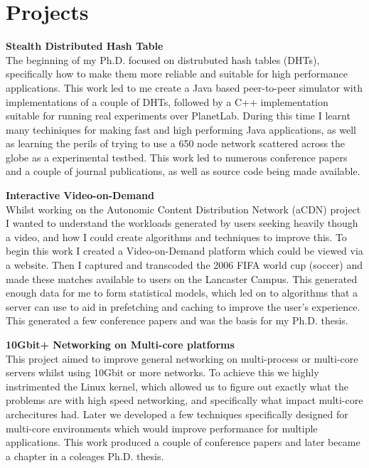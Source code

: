 \documentclass[a4paper,10pt]{article}
\begin{document}
\section{Projects}
 \textbf{Stealth Distributed Hash Table}\\
 {\footnotesize The beginning of my Ph.D. focused on distrubuted hash tables (DHTs), specifically how to make them more reliable and suitable for high performance applications. This work led to me create a Java based peer-to-peer simulator with implementations of a couple of DHTs, followed by a C++ implementation suitable for running real experiments over PlanetLab. During this time I learnt many techiniques for making fast and high performing Java applications, as well as learning the perils of trying to use a 650 node network scattered across the globe as a experimental testbed. This work led to numerous conference papers and a couple of journal publications, as well as source code being made available.}

 \textbf{Interactive Video-on-Demand}\\
 \footnotesize{Whilst working on the Autonomic Content Distribution Network (aCDN) project I wanted to understand the workloads generated by users seeking heavily though a video, and how I could create algorithms and techniques to improve this. To begin this work I created a Video-on-Demand platform which could be viewed via a website. Then I captured and transcoded the 2006 FIFA world cup (soccer) and made these matches available to users on the Lancaster Campus. This generated enough data for me to form statistical models, which led on to algorithms that a server can use to aid in prefetching and caching to improve the user's experience. This generated a few conference papers and was the basis for my Ph.D. thesis.}

 \textbf{10Gbit+ Networking on Multi-core platforms}\\
 \footnotesize{This project aimed to improve general networking on multi-process or multi-core servers whilst using 10Gbit or more networks. To achieve this we highly instrimented the Linux kernel, which allowed us to figure out exactly what the problems are with high speed networking, and specifically what impact multi-core archecitures had. Later we developed a few techniques specifically designed for multi-core environments which would improve performance for multiple applications. This work produced a couple of conference papers and later became a chapter in a coleages Ph.D. thesis.}
\end{document}
